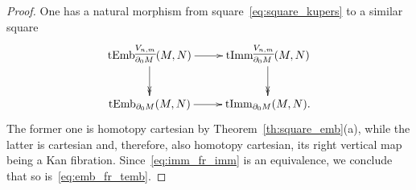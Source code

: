 \documentclass[11pt]{amsart}
\theoremstyle{definition}
\newcommand{\Emb}{\mathrm{Emb}}
\newcommand{\Imm}{\mathrm{Imm}}
\newcommand{\tImm}{\mathrm{tImm}}
\newcommand{\tEmb}{\mathrm{tEmb}}
\numberwithin{equation}{section}
\begin{document}
\begin{proof}
One has a natural morphism from square~\eqref{eq:square_kupers} to a similar square
\begin{equation}\label{eq:square_kupers2}
\xymatrix{
 \tEmb_{\partial_0M}^{\underline{V_{n,m}}}(M,N)\ar[r]\ar@{->>}[d]&  \tImm_{\partial_0M}^{\underline{V_{n,m}}}(M,N)\ar@{->>}[d]\\
\tEmb_{\partial_0 M}(M,N)\ar[r]& \tImm_{\partial_0 M}(M,N).
}
\end{equation}
The former one is homotopy cartesian by Theorem~\ref{th:square_emb}(a), while the latter
is cartesian and, therefore, also homotopy cartesian,  its right vertical map being a Kan fibration. Since~\eqref{eq:imm_fr_imm} is an equivalence, we conclude 
that so is~\eqref{eq:emb_fr_temb}. 
\end{proof}
\end{document}
